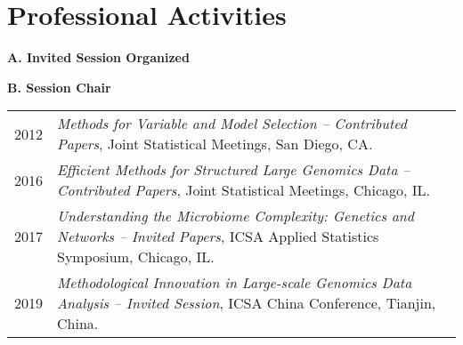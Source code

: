 \documentclass[10pt]{article}
\begin{document}

\section*{Professional Activities}

%
%

\textbf{A. Invited Session Organized}


\textbf{B. Session Chair}
\begin{table}[H]
\hskip0.9cm\begin{tabular}{p{1.6cm}p{12cm}}
2012 & {\em Methods for Variable and Model Selection -- Contributed Papers}, Joint Statistical Meetings, San Diego, CA. \\
2016 & {\em Efficient Methods for Structured Large Genomics Data -- Contributed Papers}, Joint Statistical Meetings, Chicago, IL. \\
2017 & {\em  Understanding the Microbiome Complexity: Genetics and Networks -- Invited Papers}, ICSA Applied Statistics Symposium, Chicago, IL. \\
2019 & {\em Methodological Innovation in Large-scale Genomics Data Analysis -- Invited Session}, ICSA China Conference, Tianjin, China. 
\end{tabular}
\end{table}
\end{document}

